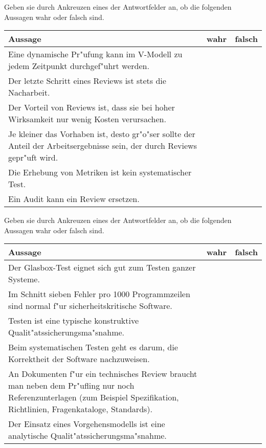 \documentclass[12pt]{exam}
\begin{document}
\begin{questions}
\question[6] Geben sie durch Ankreuzen eines der Antwortfelder an, ob die folgenden Aussagen wahr oder falsch sind. \\
\addpoints
\begin{tabular}{| p{12cm} | c | c |} \hline
    Aussage & wahr & falsch \\ \hline
    Eine dynamische Pr"ufung kann im V-Modell zu jedem Zeitpunkt durchgef"uhrt werden. & & \\ \hline
    Der letzte Schritt eines Reviews ist stets die Nacharbeit. & & \\ \hline
    Der Vorteil von Reviews ist, dass sie bei hoher Wirksamkeit nur wenig Kosten verursachen. & & \\ \hline
    Je kleiner das Vorhaben ist, desto gr"o"ser sollte der Anteil der Arbeitsergebnisse sein, der durch Reviews gepr"uft wird. & & \\ \hline
    Die Erhebung von Metriken ist kein systematischer Test. & & \\ \hline
    Ein Audit kann ein Review ersetzen. & & \\ \hline
\end{tabular}

\question[6] Geben sie durch Ankreuzen eines der Antwortfelder an, ob die folgenden Aussagen wahr oder falsch sind. \\
\addpoints
\begin{tabular}{| p{12cm} | c | c |} \hline
    Aussage & wahr & falsch \\ \hline
    Der Glasbox-Test eignet sich gut zum Testen ganzer Systeme. & & \\ \hline
    Im Schnitt sieben Fehler pro 1000 Programmzeilen sind normal f"ur sicherheitskritische Software. & & \\ \hline
    Testen ist eine typische konstruktive Qualit"atssicherungsma"snahme. & & \\ \hline
    Beim systematischen Testen geht es darum, die Korrektheit der Software nachzuweisen. & & \\ \hline
    An Dokumenten f"ur ein technisches Review braucht man neben dem Pr"ufling nur noch Referenzunterlagen (zum Beispiel Spezifikation, Richtlinien, Fragenkataloge, Standards). & & \\ \hline
    Der Einsatz eines Vorgehensmodells ist eine analytische Qualit"atssicherungsma"snahme. & & \\ \hline
\end{tabular}


\end{questions}
\end{document}
